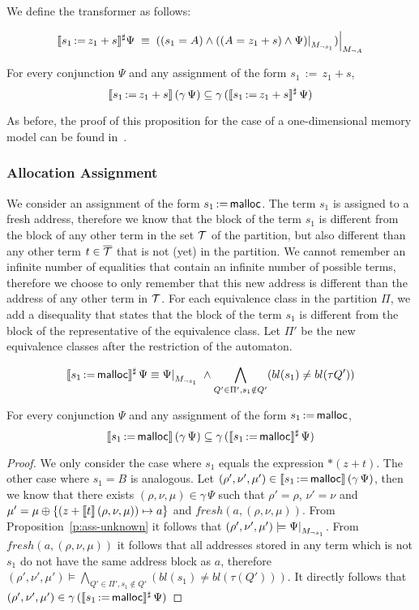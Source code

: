 We define the transformer as follows:

\[
	\sem{s_1\,{:=}\,z_1+s}^\sharp\Psi\;\equiv\;
	\restr{((s_1=A)\land\restr{((A=z_1+s)\land\Psi)}{M_{\neg s_1}})}{M_{\neg A}}
\]

\begin{proposition}\label{p:ass-definite}
	For every conjunction $\Psi$ and any assignment of the form $s_1\,{:=}\,z_1+s$,
	\[
		\llbracket s_1\,{:=}\,z_1+s\rrbracket\,(\gamma\,\Psi) \subseteq \gamma\,(\llbracket s_1\,{:=}\,z_1+s\rrbracket^\sharp\,\Psi)
	\]
\end{proposition}

As before, the proof of this proposition for the case of a one-dimensional memory model can be found in~\cite{2pointer}.

\subsubsection{Allocation Assignment}

We consider an assignment of the form $s_1\,{:=}\,\textsf{malloc}$.
The term $s_1$ is assigned to a fresh address, therefore we know that the block of the term $s_1$ is different from the block of any other term in the set $\mathcal{T}$ of the partition, but also different than any other term $t \in {\overline{\mathcal{T}}}$ that is not (yet) in the partition.
We cannot remember an infinite number of equalities that contain an infinite number of possible terms, therefore we choose to only remember that this new address is different than the address of any other term in $\mathcal{T}$.
For each equivalence class in the partition $\Pi$, we add a disequality that states that the block of the term $s_1$ is different from the block of the representative of the equivalence class.
Let $\Pi'$ be the new equivalence classes after the restriction of the automaton.

\[
	\sem{s_1\,{:=}\,\text{\malloc}}^\sharp\,\Psi \equiv
	\restr{\Psi}{M_{\neg s_1}}\;\land
	\bigwedge_{Q'\in \Pi',s_1\notin Q'}(bl(s_1) \neq bl(\tau Q'))
\]
\begin{proposition}\label{p:ass-malloc}
	For every conjunction $\Psi$ and any assignment of the form $s_1\,{:=}\,\textsf{malloc}$,
	\[
		\llbracket s_1\,{:=}\,\textsf{malloc}\rrbracket\,(\gamma\,\Psi) \subseteq \gamma\,(\llbracket s_1\,{:=}\,\textsf{malloc}\rrbracket^\sharp\,\Psi)
	\]
\end{proposition}
\begin{proof}
	We only consider the case where $s_1$ equals the expression $*(z+t)$.
	The other case where $s_1 = B$ is analogous.
	Let $(\rho',\nu',\mu') \in \llbracket s_1\,{:=}\,\textsf{malloc}\rrbracket\,(\gamma\,\Psi)$, then we know that there exists $(\rho,\nu,\mu) \in \gamma\,\Psi$ such that $\rho'=\rho$, $\nu'=\nu$ and $\mu' =\mu\oplus\{(z+\llbracket t\rrbracket\,(\rho,\nu,\mu))\mapsto a\}$ and $fresh(a, (\rho, \nu, \mu))$.
	From Proposition~\ref{p:ass-unknown} it follows that $(\rho',\nu',\mu') \models \restr{\Psi}{M_{\neg s_1}}$.
	From $fresh(a,( \rho,\nu,\mu))$ it follows that all addresses stored in any term which is not $s_1$ do not have the same address block as $a$, therefore $(\rho',\nu',\mu') \models \bigwedge_{Q'\in \Pi', s_1\notin Q'}(bl(s_1) \neq bl(\tau(Q')))$.
	It directly follows that $(\rho',\nu',\mu') \in \gamma\,(\llbracket s_1\,{:=}\,\textsf{malloc}\rrbracket^\sharp\,\Psi)$
\end{proof}
